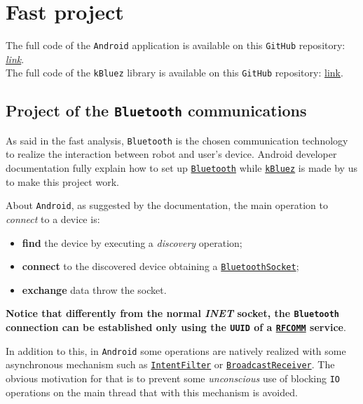 \section{Fast project}

The full code of the \texttt{Android} application is available on this \texttt{GitHub} repository:
\href{https://github.com/LucaLand/MobileSystemsProject-LL/tree/0.9.1/app/src/main/java/it/unibo/mobilesystems}{\textit{link}}.\\
The full code of the \texttt{kBluez} library is available on this \texttt{GitHub} repository: \href{https://github.com/LM-96/MobileSystemProject/tree/main/kBluez/lib/src/main/kotlin/it/unibo/kBluez}{link}.

\subsection{Project of the \texttt{Bluetooth} communications}

As said in the fast analysis, \texttt{Bluetooth} is the chosen communication technology to realize the interaction between robot and user's device.
Android developer documentation fully explain how to set up \href{https://developer.android.com/guide/topics/connectivity/bluetooth}{\texttt{Bluetooth}} while \href{https://github.com/LM-96/MobileSystemProject/tree/main/kBluez}{\texttt{kBluez}} is made by us to make this project work.

About \texttt{Android}, as suggested by the documentation, the main operation to \textit{connect} to a device is:
\begin{itemize}
	\item \textbf{find} the device by executing a \textit{discovery} operation;
	\item \textbf{connect} to the discovered device obtaining a \href{https://developer.android.com/reference/android/bluetooth/BluetoothSocket}{\texttt{BluetoothSocket}};
	\item \textbf{exchange} data throw the socket.
\end{itemize}
\textbf{Notice that differently from the normal \textit{INET} socket, the \texttt{Bluetooth} connection can be established only using the \texttt{UUID} of a \href{https://en.wikipedia.org/wiki/List_of_Bluetooth_protocols\#Radio_frequency_communication_(RFCOMM)}{\texttt{RFCOMM}} service}.

In addition to this, in \texttt{Android} some operations are natively realized with some asynchronous mechanism such as \href{https://developer.android.com/reference/android/content/IntentFilter}{\texttt{IntentFilter}} or \href{https://developer.android.com/reference/android/content/BroadcastReceiver}{\texttt{BroadcastReceiver}}. The obvious motivation for that is to prevent some \textit{unconscious} use of blocking \texttt{IO} operations on the main thread that with this mechanism is avoided.

